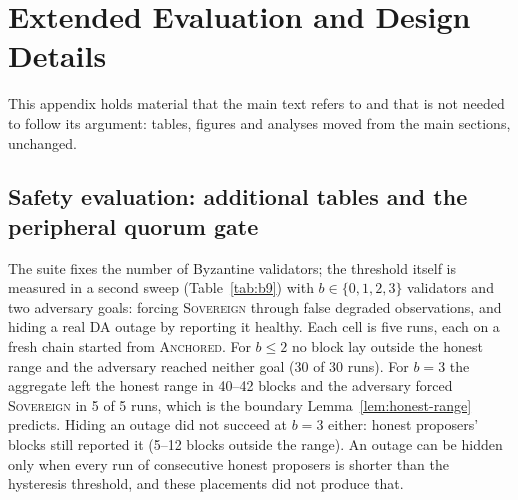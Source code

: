 \section{Extended Evaluation and Design Details}
\label{app:extended}

This appendix holds material that the main text refers to and that is not needed to follow its argument: tables, figures and analyses moved from the main sections, unchanged.

\subsection*{Safety evaluation: additional tables and the peripheral quorum gate}

\begin{table}[tbp]
\caption{Collusion suite at $n{=}7$ (A3 and A4 are the single-actor cases it
reruns; B8 is three runs of an honest split view with no adversary; c0 is the control)}
\label{tab:f2}
\centering
\scriptsize
\setlength{\tabcolsep}{3pt}
\resizebox{\linewidth}{!}{}
\end{table}

The suite fixes the number of Byzantine validators; the threshold itself is
measured in a second sweep (Table~\ref{tab:b9}) with $b \in \{0,1,2,3\}$
validators and two adversary goals: forcing \textsc{Sovereign} through false degraded
observations, and hiding a real DA outage by reporting it healthy.
Each cell is five runs, each on a fresh chain started from \textsc{Anchored}. For $b \le 2$ no block lay outside
the honest range and the adversary reached neither goal (30 of 30 runs). For $b{=}3$ the aggregate left the honest range in 40--42 blocks and
the adversary forced \textsc{Sovereign} in 5 of 5 runs, which is the boundary Lemma~\ref{lem:honest-range}
predicts. Hiding an outage did not succeed at $b{=}3$ either: honest proposers' blocks
still reported it (5--12 blocks outside the range). An outage can be hidden only
when every run of consecutive honest proposers is shorter than the hysteresis threshold, and these
placements did not produce that.

\begin{table}[tbp]
\caption{Threshold sweep: Byzantine validators $b$ at $n{=}7$ ($f{=}2$)}
\label{tab:b9}
\centering
\scriptsize
\setlength{\tabcolsep}{3pt}
\resizebox{\linewidth}{!}{}
\end{table}


